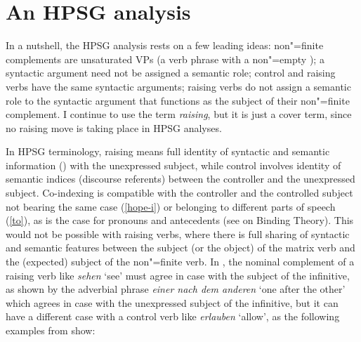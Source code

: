 \eal
{}
\zl

\section{An HPSG analysis}


In a nutshell, the HPSG analysis rests on a few leading ideas: non"=finite complements are
unsaturated VPs (a verb phrase with a non"=empty \subjl); a syntactic argument need not be assigned
a semantic role; control and raising verbs have the same syntactic arguments; raising verbs do not
assign a semantic role to the syntactic argument that functions as the subject of their non"=finite
complement. 
I continue to use the term \emph{raising}, but it is just a cover term, since no raising move
is taking place in HPSG analyses.

In HPSG terminology, raising means full identity of syntactic and semantic
information () \crossrefchapterp[\pageref{ex:prop22}--\pageref{ex:prop24}]{properties} with the unexpressed subject, while
control involves identity of semantic indices (discourse referents) between the controller and the
unexpressed subject. Co-indexing is compatible with the controller and the controlled subject not
bearing the same case (\ref{hope-i}) or belonging to different parts of speech (\ref{to}), as is the
case for pronouns and antecedents (see  on Binding Theory). This would not be possible
with raising verbs, where there is full sharing of syntactic and semantic features between the
subject (or the object) of the matrix verb and the (expected) subject of the non"=finite verb. In
, the nominal complement of a raising verb like \emph{sehen} `see' must agree in case
with the subject of the infinitive, as shown by the adverbial phrase \emph{einer nach dem anderen} `one after the other' which
agrees in case with the unexpressed subject of the infinitive, but it can have a different case with
a control verb like \emph{erlauben} `allow', as the following examples from  show: 


